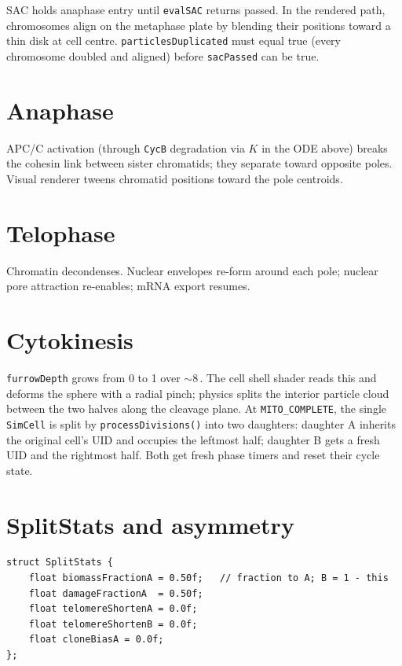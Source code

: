 \documentclass[11pt,letterpaper,twoside,openany]{book}
\newcommand{\code}[1]{\texttt{#1}}
\newcommand{\biomin}{\text{bio-min}}
\begin{document}
SAC holds anaphase entry until \code{evalSAC} returns passed. In the
rendered path, chromosomes align on the metaphase plate by blending
their positions toward a thin disk at cell centre.
\code{particlesDuplicated} must equal true (every chromosome
doubled and aligned) before \code{sacPassed} can be true.

\section{Anaphase}

APC/C activation (through \code{CycB} degradation via $K$ in the ODE
above) breaks the cohesin link between sister chromatids; they
separate toward opposite poles. Visual renderer tweens chromatid
positions toward the pole centroids.

\section{Telophase}

Chromatin decondenses. Nuclear envelopes re-form around each pole;
nuclear pore attraction re-enables; mRNA export resumes.

\section{Cytokinesis}

\code{furrowDepth} grows from 0 to 1 over $\sim$8\,\biomin. The cell
shell shader reads this and deforms the sphere with a radial pinch;
physics splits the interior particle cloud between the two halves
along the cleavage plane. At \code{MITO\_COMPLETE}, the single
\code{SimCell} is split by \code{processDivisions()} into two
daughters: daughter A inherits the original cell's UID and occupies
the leftmost half; daughter B gets a fresh UID and the rightmost
half. Both get fresh phase timers and reset their cycle state.

\section{SplitStats and asymmetry}

\begin{lstlisting}
struct SplitStats {
    float biomassFractionA = 0.50f;   // fraction to A; B = 1 - this
    float damageFractionA  = 0.50f;
    float telomereShortenA = 0.0f;
    float telomereShortenB = 0.0f;
    float cloneBiasA = 0.0f;
};
\end{lstlisting}
\end{document}
